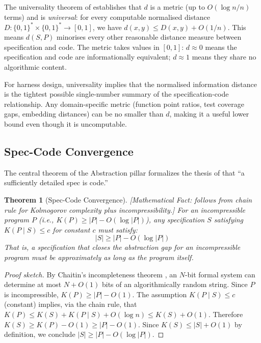 \documentclass[11pt, a4paper]{googledeepmind}
\newtheorem{theorem}{Theorem}[section]
\begin{document}
The universality theorem of \citet{li2004similarity} establishes that $d$ is a metric (up to $O(\log n / n)$ terms) and is \emph{universal}: for every computable normalised distance $D: \{0,1\}^* \times \{0,1\}^* \to [0,1]$, we have $d(x, y) \leq D(x, y) + O(1/n)$. This means $d(S, P)$ minorises every other reasonable distance measure between specification and code. The metric takes values in $[0, 1]$: $d \approx 0$ means the specification and code are informationally equivalent; $d \approx 1$ means they share no algorithmic content.

For harness design, universality implies that the normalised information distance is the tightest possible single-number summary of the specification-code relationship. Any domain-specific metric (function point ratios, test coverage gaps, embedding distances) can be no smaller than $d$, making it a useful lower bound even though it is uncomputable.

\subsection{Spec-Code Convergence}

The central theorem of the Abstraction pillar formalizes the thesis of \citet{gonzalez2026spec} that ``a sufficiently detailed spec is code.''

\begin{theorem}[Spec-Code Convergence]
\emph{[Mathematical Fact: follows from chain rule for Kolmogorov complexity plus incompressibility.]}
\label{thm:convergence}
For an incompressible program $P$ (i.e., $K(P) \geq |P| - O(\log |P|)$), any specification $S$ satisfying $K(P \mid S) \leq c$ for constant $c$ must satisfy:
\begin{equation}
    |S| \geq |P| - O(\log |P|)
\end{equation}
That is, a specification that closes the abstraction gap for an incompressible program must be approximately as long as the program itself.
\end{theorem}

\begin{proof}[Proof sketch]
By Chaitin's incompleteness theorem \citep{chaitin1966length}, an $N$-bit formal system can determine at most $N + O(1)$ bits of an algorithmically random string. Since $P$ is incompressible, $K(P) \geq |P| - O(1)$. The assumption $K(P \mid S) \leq c$ (constant) implies, via the chain rule, that $K(P) \leq K(S) + K(P \mid S) + O(\log n) \leq K(S) + O(1)$. Therefore $K(S) \geq K(P) - O(1) \geq |P| - O(1)$. Since $K(S) \leq |S| + O(1)$ by definition, we conclude $|S| \geq |P| - O(\log |P|)$.
\end{proof}
\end{document}
